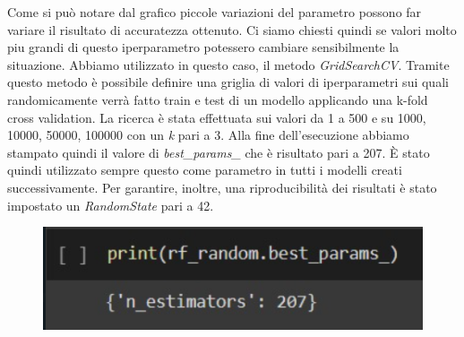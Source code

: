 \documentclass[../Report.tex]{subfiles}
\begin{document}
    Come si può notare dal grafico piccole variazioni del parametro possono far variare il risultato di accuratezza ottenuto. 
    Ci siamo chiesti quindi se valori molto piu grandi di questo iperparametro potessero cambiare sensibilmente la situazione. Abbiamo utilizzato in questo caso, il metodo \emph{GridSearchCV}. Tramite questo metodo è possibile definire una griglia di valori di iperparametri sui quali randomicamente verrà fatto train e test di un modello applicando una k-fold cross validation. La ricerca è stata effettuata sui valori da 1 a 500 e su 1000, 10000, 50000, 100000 con un \emph{k} pari a 3. Alla fine dell'esecuzione abbiamo stampato quindi il valore di \emph{best\_params\_} che è risultato pari a 207. È stato quindi utilizzato sempre questo come parametro in tutti i modelli creati successivamente. Per garantire, inoltre, una riproducibilità dei risultati è stato impostato un \emph{RandomState} pari a 42.
    \begin{figure}[H]
        \includegraphics[width=0.7\linewidth]{../../Images/bestparamsRF.png}
        \centering
    \end{figure}
\end{document}
